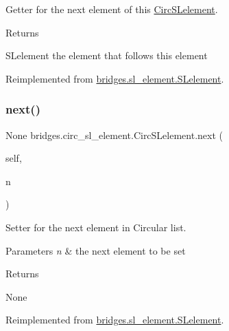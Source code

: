 Getter for the next element of this \mbox{\hyperlink{classbridges_1_1circ__sl__element_1_1_circ_s_lelement}{Circ\+S\+Lelement}}. 

\begin{DoxyReturn}{Returns}


S\+Lelement the element that follows this element 
\end{DoxyReturn}


Reimplemented from \mbox{\hyperlink{classbridges_1_1sl__element_1_1_s_lelement_acef793fc5e2533fb91795d01904e8b6d}{bridges.\+sl\+\_\+element.\+S\+Lelement}}.

\mbox{\label{classbridges_1_1circ__sl__element_1_1_circ_s_lelement_a19e7629abd5d54b9471c5167f0395ec6}} 
\subsubsection{\texorpdfstring{next()}{next()}\hspace{0.1cm}{\footnotesize\ttfamily [2/2]}}
{\footnotesize\ttfamily  None bridges.\+circ\+\_\+sl\+\_\+element.\+Circ\+S\+Lelement.\+next (\begin{DoxyParamCaption}\item[{}]{self,  }\item[{}]{n }\end{DoxyParamCaption})}



Setter for the next element in Circular list. 


\begin{DoxyParams}{Parameters}
{\em n} & the next element to be set \\
\hline
\end{DoxyParams}
\begin{DoxyReturn}{Returns}

\end{DoxyReturn}
\begin{DoxyParagraph}{None}

\end{DoxyParagraph}


Reimplemented from \mbox{\hyperlink{classbridges_1_1sl__element_1_1_s_lelement_a210373939597f4c3bcc26fff98b4e44f}{bridges.\+sl\+\_\+element.\+S\+Lelement}}.



